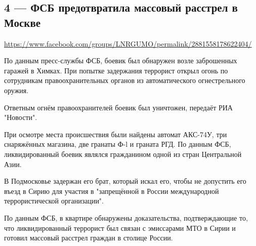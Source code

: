  
 
  
\clearpage
\subsection{4 --- ФСБ предотвратила массовый расстрел в Москве}
\label{sec:27_07_2020.fb.lnr.4}
\url{https://www.facebook.com/groups/LNRGUMO/permalink/2881558178622404/}


По данным пресс-службы ФСБ, боевик был обнаружен возле заброшенных гаражей в
Химках.  При попытке задержания террорист открыл огонь по сотрудникам
правоохранительных органов из автоматического огнестрельного оружия.

Ответным огнём правоохранителей боевик был уничтожен, передаёт РИА "Новости".

При осмотре места происшествия были найдены автомат АКС-74У, три снаряжённых
магазина, две гранаты Ф-l и граната РГД.  По данным ФСБ, ликвидированный боевик
являлся гражданином одной из стран Центральной Азии.

В Подмосковье задержан его брат, который искал его, чтобы не допустить его
въезд в Сирию для участия в "запрещённой в России международной
террористической организации".

По данным ФСБ, в квартире обнаружены доказательства, подтверждающие то, что
ликвидированный террорист был связан с эмиссарами МТО в Сирии и готовил
массовый расстрел граждан в столице России.
  
